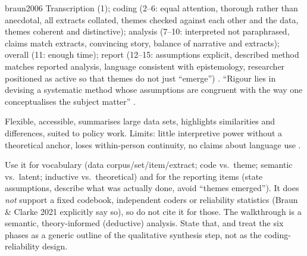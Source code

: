 \begin{papercard}{braun2006}
 Transcription (1); coding (2--6: equal attention, thorough rather than anecdotal, all extracts collated, themes checked against each other and the data, themes coherent and distinctive); analysis (7--10: interpreted not paraphrased, claims match extracts, convincing story, balance of narrative and extracts); overall (11: enough time); report (12--15: assumptions explicit, described method matches reported analysis, language consistent with epistemology, researcher positioned as active so that themes do not just ``emerge'') . ``Rigour lies in devising a systematic method whose assumptions are congruent with the way one conceptualises the subject matter'' .

 Flexible, accessible, summarises large data sets, highlights similarities and differences, suited to policy work. Limits: little interpretive power without a theoretical anchor, loses within-person continuity, no claims about language use .

 Use it for vocabulary (data corpus/set/item/extract; code vs.\ theme; semantic vs.\ latent; inductive vs.\ theoretical) and for the reporting items (state assumptions, describe what was actually done, avoid ``themes emerged''). It does \emph{not} support a fixed codebook, independent coders or reliability statistics (Braun \& Clarke 2021 explicitly say so), so do not cite it for those. The walkthrough is a semantic, theory-informed (deductive) analysis. State that, and treat the six phases as a generic outline of the qualitative synthesis step, not as the coding-reliability design.
\end{papercard}
